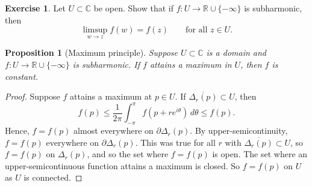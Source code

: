 \documentclass[12pt,openany]{book}
\newcommand{\C}{{\mathbb{C}}}
\newcommand{\R}{{\mathbb{R}}}
\theoremstyle{plain}
\newtheorem{prop}[thm]{Proposition}
\theoremstyle{remark}
\theoremstyle{definition}
\newenvironment{exbox}{%
    \def\FrameCommand{\vrule width 1pt \relax\hspace {10pt}}%
    \MakeFramed {\advance \hsize -\width \FrameRestore }%
}{%
    \endMakeFramed
}
\theoremstyle{exercise}
\newtheorem{exercise}{Exercise}[section]
\theoremstyle{example}
\begin{document}
\begin{exbox}
\begin{exercise}
Let $U \subset \C$ be open.
Show that if $f \colon U \to \R \cup\{- \infty \}$ is subharmonic,
then 
\begin{equation*}
\limsup_{w \to z} f(w) = f(z) 
\qquad \text{for all $z \in U$.}
\end{equation*}
\end{exercise}
\end{exbox}

\begin{prop}[Maximum principle]
Suppose $U \subset \C$ is a domain and $f \colon U \to \R \cup \{ -\infty \}$
is subharmonic.  If $f$ attains a maximum in $U$, then $f$ is constant.
\end{prop}

\begin{proof}
Suppose $f$ attains a maximum at $p \in U$.
If
$\overline{\Delta_r(p)} \subset U$, then
\begin{equation*}
f(p) \leq \frac{1}{2\pi} \int_{-\pi}^{\pi} f(p+re^{i\theta})\, d\theta \leq f(p)
.
\end{equation*}
Hence, $f = f(p)$ almost everywhere on $\partial \Delta_r(p)$.
By upper-semicontinuity, $f = f(p)$ everywhere on $\partial \Delta_r(p)$.
This was true for all $r$
with $\overline{\Delta_r(p)} \subset U$, so $f=f(p)$ on $\Delta_r(p)$,
and so the set where $f=f(p)$ is open.  The set where an upper-semicontinuous
function attains a maximum is closed.  So $f=f(p)$ on $U$ as $U$ is
connected.
\end{proof}
\end{document}
